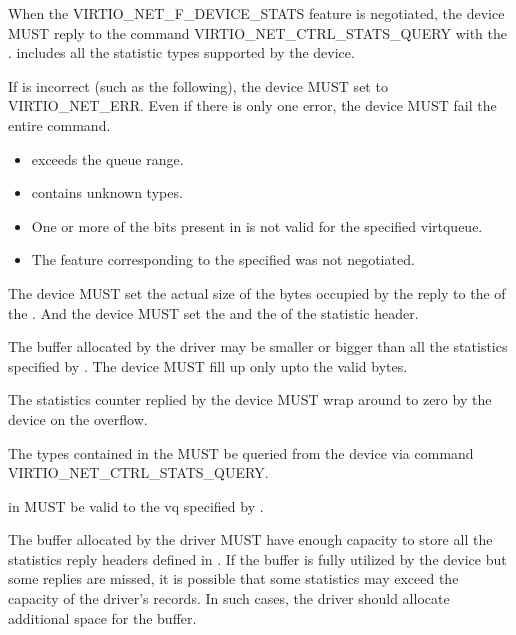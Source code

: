 
When the VIRTIO_NET_F_DEVICE_STATS feature is negotiated, the device MUST reply
to the command VIRTIO_NET_CTRL_STATS_QUERY with the
. 
includes all the statistic types supported by the device.

If  is incorrect (such as the
following), the device MUST set  to VIRTIO_NET_ERR. Even if there is
only one error, the device MUST fail the entire command.
\begin{itemize}
    \item {} exceeds the queue range.
    \item {} contains unknown types.
    \item One or more of the bits present in  is not valid
        for the specified virtqueue.
    \item The feature corresponding to the specified  was
        not negotiated.
\end{itemize}

The device MUST set the actual size of the bytes occupied by the reply to the
 of the . And the device MUST set the  and
the  of the statistic header.

The  buffer allocated by the driver may be
smaller or bigger than all the statistics specified by
. The device MUST fill up only upto
the valid bytes.

The statistics counter replied by the device MUST wrap around to zero by the
device on the overflow.


The types contained in the  MUST be queried from the device
via command VIRTIO_NET_CTRL_STATS_QUERY.

 in  MUST be valid to the
vq specified by .

The  buffer allocated by the driver MUST have
enough capacity to store all the statistics reply headers defined in
. If the
 buffer is fully utilized by the device but some
replies are missed, it is possible that some statistics may exceed the capacity
of the driver's records. In such cases, the driver should allocate additional
space for the  buffer.

